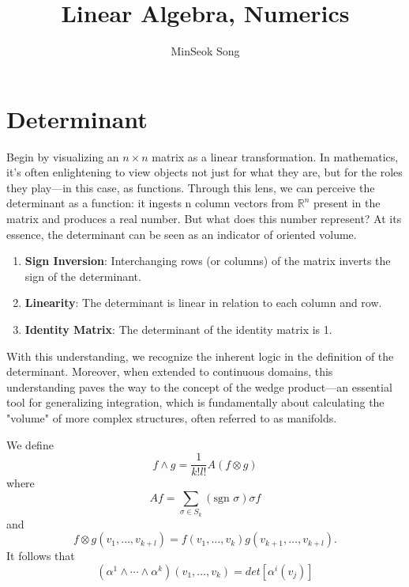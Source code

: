 \documentclass[11pt,reqno]{amsart}
\title{Linear Algebra, Numerics}
\author{MinSeok Song}
\date{}
\theoremstyle{remark}
\begin{document}
\maketitle
\tableofcontents

\section{Determinant}
Begin by visualizing an $n\times n$ matrix as a linear transformation. In mathematics, it's often enlightening to 
view objects not just for what they are, but for the roles they play—in this case, as functions. Through this lens, we can perceive the determinant as a function: it ingests
n column vectors from $\mathbb{R}^n$ present in the matrix and 
produces a real number. But what does this number represent? At its essence, the determinant 
can be seen as an indicator of oriented volume.
  \begin{enumerate}
  \item \textbf{Sign Inversion}: Interchanging rows (or columns) of the matrix inverts the sign of the determinant.
  \item \textbf{Linearity}: The determinant is linear in relation to each column and row.
  \item \textbf{Identity Matrix}: The determinant of the identity matrix is 1.
  \end{enumerate}

  With this understanding, we recognize the inherent logic in the definition
   of the determinant. Moreover, when extended to continuous domains, this understanding paves the way to the concept of the wedge product—an 
   essential tool for generalizing integration, which is fundamentally about calculating the 
   "volume" of more complex structures, often referred to as manifolds.


We define $$f\wedge g=\frac 1{k!l!}A(f\otimes g)$$ where
$$Af=\sum_{\sigma\in S_k}(\text{sgn } \sigma)\sigma f$$ and $$f\otimes g(v_1,\dots,v_{k+l})=f(v_1,\dots,v_k)g(v_{k+1},\dots,v_{k+l}).$$
  It follows that $$(\alpha^1\wedge\cdots\wedge \alpha^k)(v_1,\dots, v_k)=det[\alpha^i(v_j)]$$
\end{document}
